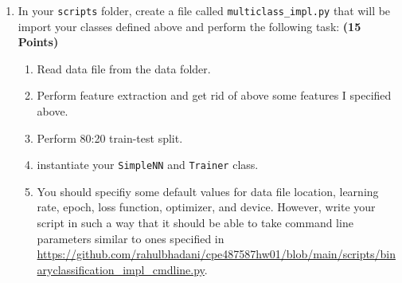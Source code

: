 \documentclass[12pt, xcolor=dvipsnames,svgnames,x11names]{article}
\begin{document}
\begin{enumerate}
\begin{enumerate}
\item train(): it would invoke the training process upon calling. This function doesn't take any argument.
\item test():  it would perform test using test data. It would take two arguments: X\_test, and y\_test.
\item predict(): it would make inference using a set of features. It takes only one argument: X
\item save(): it will save the trained model in onnx format. It may take one argument optionally: file name of the model to be saved.
\item evaluation(): this function takes loss vector and accuracy vector and plot to demonstrate the performance on training set. In addition, it also creates a plot of confusion matrix showing correct label and predicted labels, as well as final F1 score, Precision, Recall, and Accuracy for both training and test dataset.
\end{enumerate}

You will need to  modify your \texttt{__init__.py} accordingly so that you can use them later.

\item In your \texttt{scripts} folder, create a file called \texttt{multiclass_impl.py} that will be import your classes defined above and perform the following task: \hfill \textbf{(15 Points)}

\begin{enumerate}
\item Read data file from the data folder.
\item Perform feature extraction and get rid of above some features I specified above.
\item Perform 80:20 train-test split.
\item instantiate your \texttt{SimpleNN}  and \texttt{Trainer} class.
\item You should specifiy some default values for data file location, learning rate,  epoch, loss function, optimizer, and device. However, write your script in such a way that it should be able to take command line parameters similar to ones specified in \url{https://github.com/rahulbhadani/cpe487587hw01/blob/main/scripts/binaryclassification_impl_cmdline.py}.


\end{enumerate}
\end{enumerate}
\end{document}
